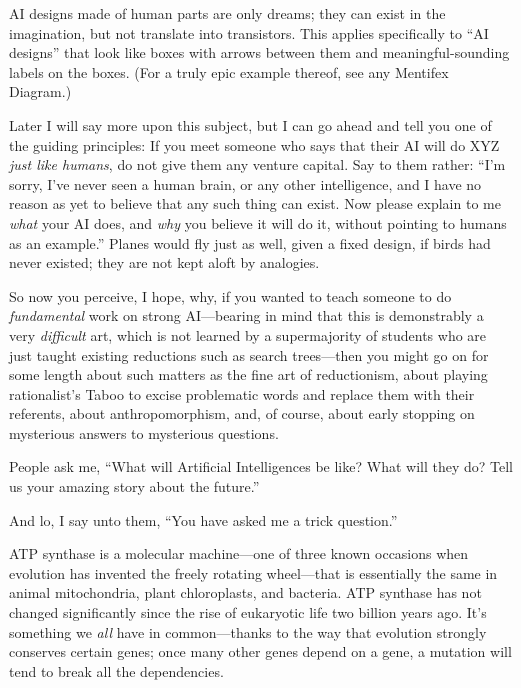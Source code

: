 {
 AI designs made of human parts are only dreams; they can exist in
the imagination, but not translate into transistors. This applies
specifically to ``AI designs'' that
look like boxes with arrows between them and meaningful-sounding labels
on the boxes. (For a truly epic example thereof, see any Mentifex
Diagram.)}

{
 Later I will say more upon this subject, but I can go ahead and
tell you one of the guiding principles: If you meet someone who says
that their AI will do XYZ \textit{just like humans}, do not give them
any venture capital. Say to them rather:
``I'm sorry, I've
never seen a human brain, or any other intelligence, and I have no
reason as yet to believe that any such thing can exist. Now please
explain to me \textit{what} your AI does, and \textit{why} you believe
it will do it, without pointing to humans as an
example.'' Planes would fly just as well, given a
fixed design, if birds had never existed; they are not kept aloft by
analogies.}

{
 So now you perceive, I hope, why, if you wanted to teach someone
to do \textit{fundamental} work on strong AI---bearing in mind that
this is demonstrably a very \textit{difficult} art, which is not
learned by a supermajority of students who are just taught existing
reductions such as search trees---then you might go on for some length
about such matters as the fine art of reductionism, about playing
rationalist's Taboo to excise problematic words and
replace them with their referents, about anthropomorphism, and, of
course, about early stopping on mysterious answers to mysterious
questions.}

\myendsectiontext


\bigskip


{
 People ask me, ``What will Artificial
Intelligences be like? What will they do? Tell us your amazing story
about the future.'' }

{
 And lo, I say unto them, ``You have asked me a
trick question.''}

{
 ATP synthase is a molecular machine---one of three known occasions
when evolution has invented the freely rotating wheel---that is
essentially the same in animal mitochondria, plant chloroplasts, and
bacteria. ATP synthase has not changed significantly since the rise of
eukaryotic life two billion years ago. It's something
we \textit{all} have in common---thanks to the way that evolution
strongly conserves certain genes; once many other genes depend on a
gene, a mutation will tend to break all the dependencies.}

